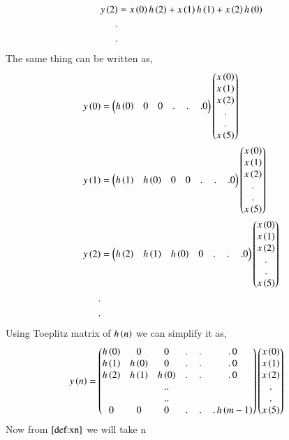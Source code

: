 \documentclass[journal,12pt,twocolumn]{IEEEtran}
\renewcommand\thesection{\arabic{section}}
\begin{document}
\begin{enumerate}[label=\thesection.\arabic*]
\begin{align}
      y\left(2\right) &= x\left(0\right)h\left(2\right) + x\left(1\right)h\left(1\right) + x\left(2\right)h\left(0\right)\\
      . \nonumber&\\ 
      .& \nonumber
     \end{align}
    The same thing can be written as,
     \begin{align}
       y\left(0\right) &= \begin{pmatrix}h\left(0\right) & 0 & 0 &.\,&.\,&.0\end{pmatrix}\begin{pmatrix}x\left(0\right)\\x\left(1\right)\\x\left(2\right)\\ . \\.\\x\left(5\right)\end{pmatrix}\\
       y\left(1\right) &= \begin{pmatrix}h\left(1\right) & h\left(0\right) & 0 & 0 &.\,&.\,&.0\end{pmatrix}\begin{pmatrix}x\left(0\right)\\x\left(1\right)\\x\left(2\right)\\ . \\.\\x\left(5\right)\end{pmatrix}\\
       y\left(2\right) &= \begin{pmatrix}h\left(2\right) & h\left(1\right) & h\left(0\right) & 0& .\,&.\,&.0\end{pmatrix}\begin{pmatrix}x\left(0\right)\\x\left(1\right)\\x\left(2\right)\\ . \\.\\x\left(5\right)\end{pmatrix}\\
       . & \nonumber \\
       .& \nonumber
     \end{align}
    Using Toeplitz matrix of $h\left(n\right)$ we can simplify it as,
     \begin{align}
       y\left(n\right) &= \begin{pmatrix}h\left(0\right) & 0 & 0 &.\,&.\,&.\,0 \\
                           h\left(1\right) & h\left(0\right) & 0 & .\,&.\,&.\,0 \\
                           h\left(2\right) & h\left(1\right) & h\left(0\right) & .\,&.\,&.\,0 \\
                            &&..\\&&..\\ 0 & 0 &  0 &.\,&.\,&.\, h\left(m-1\right)\end{pmatrix}\begin{pmatrix}x\left(0\right)\\x\left(1\right)\\x\left(2\right)\\ . \\.\\x\left(5\right)\end{pmatrix}\label{eq:ynconv_toep}
     \end{align}
     Now from $\eqref{def:xn}$ we will take n 

\end{enumerate}
\end{document}
